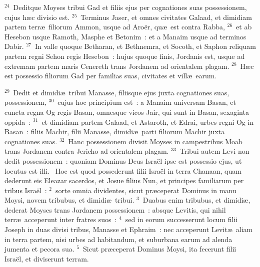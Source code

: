 ${}^{24}$~Deditque Moyses tribui Gad et filiis ejus per cognationes suas possessionem, cujus h\ae c divisio est.
${}^{25}$~Terminus Jaser, et omnes civitates Galaad, et dimidiam partem terr\ae\ filiorum Ammon, usque ad Aro\"er, qu\ae\ est contra Rabba,
${}^{26}$~et ab Hesebon usque Ramoth, Masphe et Betonim~: et a Manaim usque ad terminos Dabir.
${}^{27}$~In valle quoque Betharan, et Bethnemra, et Socoth, et Saphon reliquam partem regni Sehon regis Hesebon~: hujus quoque finis, Jordanis est, usque ad extremam partem maris Cenereth trans Jordanem ad orientalem plagam.
${}^{28}$~H\ae c est possessio filiorum Gad per familias suas, civitates et vill\ae\ earum.


${}^{29}$~Dedit et dimidi\ae\ tribui Manasse, filiisque ejus juxta cognationes suas, possessionem,
${}^{30}$~cujus hoc principium est~: a Manaim universam Basan, et cuncta regna Og regis Basan, omnesque vicos Jair, qui sunt in Basan, sexaginta oppida~:
${}^{31}$~et dimidiam partem Galaad, et Astaroth, et Edrai, urbes regni Og in Basan~: filiis Machir, filii Manasse, dimidi\ae\ parti filiorum Machir juxta cognationes suas.
${}^{32}$~Hanc possessionem divisit Moyses in campestribus Moab trans Jordanem contra Jericho ad orientalem plagam.
${}^{33}$~Tribui autem Levi non dedit possessionem~: quoniam Dominus Deus Isra\"el ipse est possessio ejus, ut locutus est illi.
~\lettrine[lines=10,image=true,loversize=0.05,lraise=-0.03]{H}{}oc est quod possederunt filii Isra\"el in terra Chanaan, quam dederunt eis Eleazar sacerdos, et Josue filius Nun, et principes familiarum per tribus Isra\"el~:
${}^{2}$~sorte omnia dividentes, sicut pr\ae ceperat Dominus in manu Moysi, novem tribubus, et dimidi\ae\ tribui.
${}^{3}$~Duabus enim tribubus, et dimidi\ae , dederat Moyses trans Jordanem possessionem~: absque Levitis, qui nihil terr\ae\ acceperunt inter fratres suos~:
${}^{4}$~sed in eorum successerunt locum filii Joseph in duas divisi tribus, Manasse et Ephraim~: nec acceperunt Levit\ae\ aliam in terra partem, nisi urbes ad habitandum, et suburbana earum ad alenda jumenta et pecora sua.
${}^{5}$~Sicut pr\ae ceperat Dominus Moysi, ita fecerunt filii Isra\"el, et diviserunt terram.


